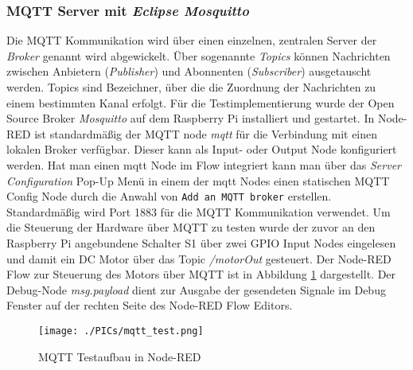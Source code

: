 \documentclass[BMR,Bachelor,ngerman]{twbook}%
\begin{document}
\subsubsection{MQTT Server mit \emph{Eclipse Mosquitto}}
Die \ac{MQTT} Kommunikation wird über einen einzelnen, zentralen Server der \emph{Broker} genannt wird abgewickelt. Über sogenannte \emph{Topics} können Nachrichten zwischen Anbietern (\emph{Publisher}) und Abonnenten (\emph{Subscriber}) ausgetauscht werden. Topics sind Bezeichner, über die die Zuordnung der Nachrichten zu einem bestimmten Kanal erfolgt. Für die Testimplementierung wurde der Open Source Broker \emph{Mosquitto} \cite{mosquitto2018} auf dem Raspberry Pi installiert und gestartet. In Node-RED ist standardmäßig der \ac{MQTT} node \emph{mqtt} für die Verbindung mit einen lokalen Broker verfügbar. Dieser kann als Input- oder Output Node konfiguriert werden. Hat man einen mqtt Node im Flow integriert kann man über das \emph{Server Configuration} Pop-Up Menü in einem der mqtt Nodes einen statischen MQTT Config Node durch die Anwahl von \verb+Add an MQTT broker+ erstellen. Standardmäßig wird Port 1883 für die \ac{MQTT} Kommunikation verwendet. Um die Steuerung der Hardware über \ac{MQTT} zu testen wurde der zuvor an den Raspberry Pi angebundene Schalter S1 über zwei \ac{GPIO} Input Nodes eingelesen und damit ein DC Motor über das Topic \emph{/motorOut} gesteuert. Der Node-RED Flow zur Steuerung des Motors über \ac{MQTT} ist in Abbildung \ref{fig:test_mqtt} dargestellt. Der Debug-Node \emph{msg.payload} dient zur Ausgabe der gesendeten Signale im Debug Fenster auf der rechten Seite des Node-RED Flow Editors.
%
\begin{figure}[!htbp]
\centering
\texttt{[image: ./PICs/mqtt\_test.png]}
\caption{MQTT Testaufbau in Node-RED}\label{fig:test_mqtt}
\end{figure}
%
\end{document}
